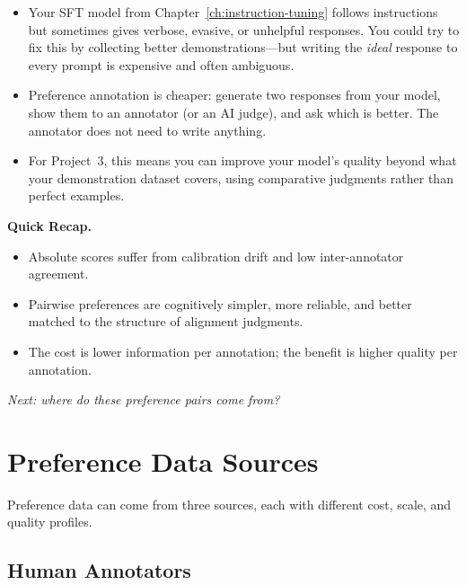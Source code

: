 \begin{tcolorbox}[colback=orange!5, colframe=orange!60, title=\textbf{For Project~3: Why Not Just Collect More SFT Data?}]
\begin{itemize}[nosep]
  \item Your SFT model from Chapter~\ref{ch:instruction-tuning} follows instructions but sometimes gives verbose, evasive, or unhelpful responses. You could try to fix this by collecting better demonstrations---but writing the \emph{ideal} response to every prompt is expensive and often ambiguous.
  \item Preference annotation is cheaper: generate two responses from your model, show them to an annotator (or an AI judge), and ask which is better. The annotator does not need to write anything.
  \item For Project~3, this means you can improve your model's quality beyond what your demonstration dataset covers, using comparative judgments rather than perfect examples.
\end{itemize}
\end{tcolorbox}

\begin{quickrecap}
\textbf{Quick Recap.}
\begin{itemize}[nosep,leftmargin=1.5em]
  \item Absolute scores suffer from calibration drift and low inter-annotator agreement.
  \item Pairwise preferences are cognitively simpler, more reliable, and better matched to the structure of alignment judgments.
  \item The cost is lower information per annotation; the benefit is higher quality per annotation.
\end{itemize}
\textit{Next: where do these preference pairs come from?}
\end{quickrecap}


\section{Preference Data Sources}
\label{sec:preference-sources}

Preference data can come from three sources, each with different cost, scale, and quality profiles.

\subsection{Human Annotators}

